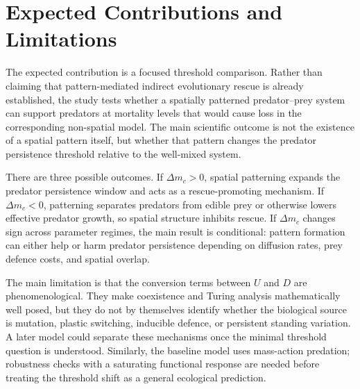 \documentclass[12pt,letterpaper]{article}
\numberwithin{equation}{section}
\begin{document}
\section{Expected Contributions and Limitations}

The expected contribution is a focused threshold comparison. Rather than claiming that
pattern-mediated indirect evolutionary rescue is already established, the study tests
whether a spatially patterned predator--prey system can support predators at mortality
levels that would cause loss in the corresponding non-spatial model.
The main scientific outcome is not the existence of a spatial pattern itself, but
whether that pattern changes the predator persistence threshold relative to the
well-mixed system.

There are three possible outcomes. If $\Delta m_c>0$, spatial patterning expands the
predator persistence window and acts as a rescue-promoting mechanism. If
$\Delta m_c<0$, patterning separates predators from edible prey or otherwise lowers
effective predator growth, so spatial structure inhibits rescue. If $\Delta m_c$
changes sign across parameter regimes, the main result is conditional: pattern
formation can either help or harm predator persistence depending on diffusion rates,
prey defence costs, and spatial overlap.

The main limitation is that the conversion terms between $U$ and $D$ are
phenomenological. They make coexistence and Turing analysis mathematically well posed,
but they do not by themselves identify whether the biological source is mutation,
plastic switching, inducible defence, or persistent standing variation. A later model
could separate these mechanisms once the minimal threshold question is understood.
Similarly, the baseline model uses mass-action predation; robustness checks with a
saturating functional response are needed before treating the threshold shift as a
general ecological prediction.
\end{document}
